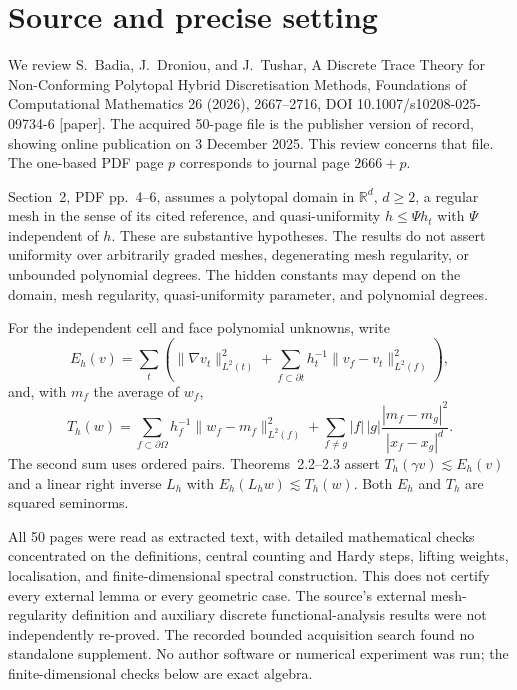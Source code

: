 \documentclass[10pt]{article}
\begin{document}
\section*{Source and precise setting}
We review S. Badia, J. Droniou, and J. Tushar, A Discrete Trace Theory for Non-Conforming Polytopal Hybrid Discretisation Methods, Foundations of Computational Mathematics 26 (2026), 2667–2716, DOI 10.1007/s10208-025-09734-6 [paper]. The acquired 50-page file is the publisher version of record, showing online publication on 3 December 2025. This review concerns that file. The one-based PDF page \(p\) corresponds to journal page \(2666+p\).\par
Section 2, PDF pp. 4–6, assumes a polytopal domain in \(\mathbb R^d\), \(d\ge2\), a regular mesh in the sense of its cited reference, and quasi-uniformity \(h\le\Psi h_t\) with \(\Psi\) independent of \(h\). These are substantive hypotheses. The results do not assert uniformity over arbitrarily graded meshes, degenerating mesh regularity, or unbounded polynomial degrees. The hidden constants may depend on the domain, mesh regularity, quasi-uniformity parameter, and polynomial degrees.\par
For the independent cell and face polynomial unknowns, write \[E_h(v)=\sum_t\left(\|\nabla v_t\|_{L^2(t)}^2+
       \sum_{f\subset\partial t}h_t^{-1}
            \|v_f-v_t\|_{L^2(f)}^2\right),\] and, with \(m_f\) the average of \(w_f\), \[T_h(w)=\sum_{f\subset\partial\Omega}
      h_f^{-1}\|w_f-m_f\|_{L^2(f)}^2
 +\sum_{f\ne g}|f|\,|g|\frac{|m_f-m_g|^2}{|x_f-x_g|^d}.\] The second sum uses ordered pairs. Theorems 2.2–2.3 assert \(T_h(\gamma v)\lesssim E_h(v)\) and a linear right inverse \(L_h\) with \(E_h(L_hw)\lesssim T_h(w)\). Both \(E_h\) and \(T_h\) are squared seminorms.\par
All 50 pages were read as extracted text, with detailed mathematical checks concentrated on the definitions, central counting and Hardy steps, lifting weights, localisation, and finite-dimensional spectral construction. This does not certify every external lemma or every geometric case. The source’s external mesh-regularity definition and auxiliary discrete functional-analysis results were not independently re-proved. The recorded bounded acquisition search found no standalone supplement. No author software or numerical experiment was run; the finite-dimensional checks below are exact algebra.\par
\end{document}
